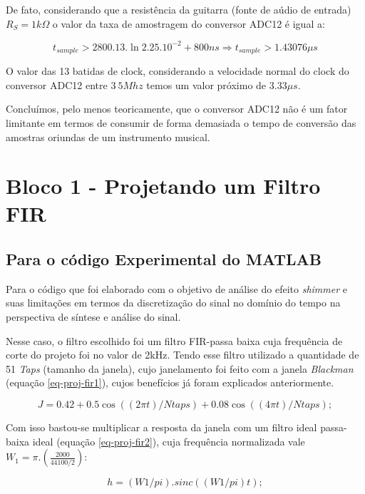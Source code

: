 			De fato, considerando que a resistência da guitarra (fonte de aúdio de entrada) $ R_S = 1k\Omega $ o valor da taxa de amostragem do conversor ADC12 é igual a:
			
			\[t_{sample} > 2800.13.\ln 2 . 25. 10^{-2} + 800ns\Rightarrow \boxed{t_{sample} > 1.43076\mu s}\]
			
			O valor das 13 batidas de clock, considerando a velocidade normal do clock do conversor ADC12 entre $ 3~5Mhz $ temos um valor próximo de $ 3.33 \mu s $.
			
			Concluímos, pelo menos teoricamente, que o conversor ADC12 não é um fator limitante em termos de consumir de forma demasiada o tempo de conversão das amostras oriundas de um instrumento musical.
									
			
\section{Bloco 1 - Projetando um Filtro FIR}
	\subsection{Para o código Experimental do MATLAB}
		
		Para o código que foi elaborado com o objetivo de análise do efeito \textit{shimmer} e suas limitações em termos da discretização do sinal no domínio do tempo na perspectiva de síntese e análise do sinal.
		
		Nesse caso, o filtro escolhido foi um filtro FIR-passa baixa cuja frequência de corte do projeto foi no valor de 2kHz. Tendo esse filtro utilizado a quantidade de 51 \textit{Taps} (tamanho da janela), cujo janelamento foi feito com a janela \textit{Blackman} (equação \ref{eq-proj-fir1}), cujos benefícios já foram explicados anteriormente.
		
		\begin{equation}
			J = 0.42 + 0.5\cos((2\pi t)/Ntaps) + 0.08\cos((4\pi t)/Ntaps);
			\label{eq-proj-fir1}
		\end{equation}
		
		Com isso bastou-se multiplicar a resposta da janela com um filtro ideal passa-baixa ideal (equação \ref{eq-proj-fir2}), cuja frequência normalizada vale $W_1 = \pi.\left(\frac{2000}{44100/2}\right)$:
		
		\begin{equation}
			h= (W1/pi).sinc((W1/pi)t);
			\label{eq-proj-fir2}
		\end{equation}
		
